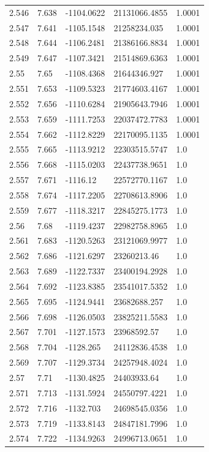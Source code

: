 \begin{tabular}{lllll}
2.546 & 7.638 & -1104.0622 & 21131066.4855 & 1.0001 \\
2.547 & 7.641 & -1105.1548 & 21258234.035 & 1.0001 \\
2.548 & 7.644 & -1106.2481 & 21386166.8834 & 1.0001 \\
2.549 & 7.647 & -1107.3421 & 21514869.6363 & 1.0001 \\
2.55 & 7.65 & -1108.4368 & 21644346.927 & 1.0001 \\
2.551 & 7.653 & -1109.5323 & 21774603.4167 & 1.0001 \\
2.552 & 7.656 & -1110.6284 & 21905643.7946 & 1.0001 \\
2.553 & 7.659 & -1111.7253 & 22037472.7783 & 1.0001 \\
2.554 & 7.662 & -1112.8229 & 22170095.1135 & 1.0001 \\
2.555 & 7.665 & -1113.9212 & 22303515.5747 & 1.0 \\
2.556 & 7.668 & -1115.0203 & 22437738.9651 & 1.0 \\
2.557 & 7.671 & -1116.12 & 22572770.1167 & 1.0 \\
2.558 & 7.674 & -1117.2205 & 22708613.8906 & 1.0 \\
2.559 & 7.677 & -1118.3217 & 22845275.1773 & 1.0 \\
2.56 & 7.68 & -1119.4237 & 22982758.8965 & 1.0 \\
2.561 & 7.683 & -1120.5263 & 23121069.9977 & 1.0 \\
2.562 & 7.686 & -1121.6297 & 23260213.46 & 1.0 \\
2.563 & 7.689 & -1122.7337 & 23400194.2928 & 1.0 \\
2.564 & 7.692 & -1123.8385 & 23541017.5352 & 1.0 \\
2.565 & 7.695 & -1124.9441 & 23682688.257 & 1.0 \\
2.566 & 7.698 & -1126.0503 & 23825211.5583 & 1.0 \\
2.567 & 7.701 & -1127.1573 & 23968592.57 & 1.0 \\
2.568 & 7.704 & -1128.265 & 24112836.4538 & 1.0 \\
2.569 & 7.707 & -1129.3734 & 24257948.4024 & 1.0 \\
2.57 & 7.71 & -1130.4825 & 24403933.64 & 1.0 \\
2.571 & 7.713 & -1131.5924 & 24550797.4221 & 1.0 \\
2.572 & 7.716 & -1132.703 & 24698545.0356 & 1.0 \\
2.573 & 7.719 & -1133.8143 & 24847181.7996 & 1.0 \\
2.574 & 7.722 & -1134.9263 & 24996713.0651 & 1.0 \\

\end{tabular}
